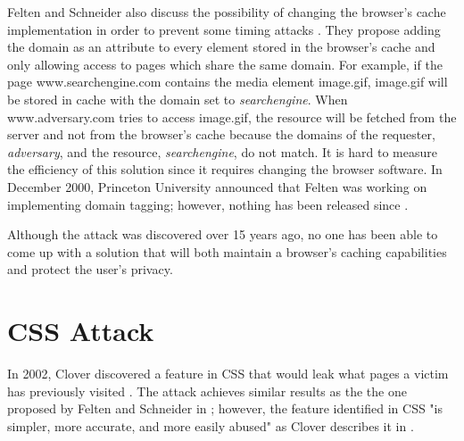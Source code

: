 \documentclass[10pt,a4paper,twoside]{book}
\begin{document}
Felten and Schneider also discuss the possibility of changing the browser's cache implementation in order to prevent some timing attacks \cite{felten2000timing}. They propose adding the domain as an attribute to every element stored in the browser's cache and only allowing access to pages which share the same domain. For example, if the page www.searchengine.com contains the media element image.gif, image.gif will be stored in cache with the domain set to \textit{searchengine}. When www.adversary.com tries to access image.gif, the resource will be fetched from the server and not from the browser's cache because the domains of the requester, \textit{adversary}, and the resource, \textit{searchengine}, do not match. It is hard to measure the efficiency of this solution since it requires changing the browser software. In December 2000, Princeton University announced that Felten was working on implementing domain tagging; however, nothing has been released since \cite{princetonunifelten}.

Although the attack was discovered over 15 years ago, no one has been able to come up with a solution that will both maintain a browser's caching capabilities and protect the user's privacy.



\section{CSS Attack}

In 2002, Clover discovered a feature in CSS that would leak what pages a victim has previously visited \cite{cssvisited}. The attack achieves similar results as the the one proposed by Felten and Schneider in \cite{felten2000timing}; however, the feature identified in CSS 
"is simpler, more accurate, and more easily abused" as Clover describes it in \cite{cssvisited}.
\end{document}
